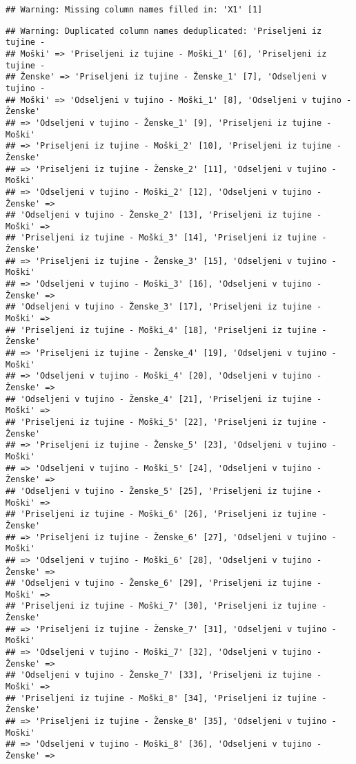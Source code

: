 \documentclass[]{article}
\begin{document}
\begin{verbatim}
## Warning: Missing column names filled in: 'X1' [1]
\end{verbatim}

\begin{verbatim}
## Warning: Duplicated column names deduplicated: 'Priseljeni iz tujine -
## Moški' => 'Priseljeni iz tujine - Moški_1' [6], 'Priseljeni iz tujine -
## Ženske' => 'Priseljeni iz tujine - Ženske_1' [7], 'Odseljeni v tujino -
## Moški' => 'Odseljeni v tujino - Moški_1' [8], 'Odseljeni v tujino - Ženske'
## => 'Odseljeni v tujino - Ženske_1' [9], 'Priseljeni iz tujine - Moški'
## => 'Priseljeni iz tujine - Moški_2' [10], 'Priseljeni iz tujine - Ženske'
## => 'Priseljeni iz tujine - Ženske_2' [11], 'Odseljeni v tujino - Moški'
## => 'Odseljeni v tujino - Moški_2' [12], 'Odseljeni v tujino - Ženske' =>
## 'Odseljeni v tujino - Ženske_2' [13], 'Priseljeni iz tujine - Moški' =>
## 'Priseljeni iz tujine - Moški_3' [14], 'Priseljeni iz tujine - Ženske'
## => 'Priseljeni iz tujine - Ženske_3' [15], 'Odseljeni v tujino - Moški'
## => 'Odseljeni v tujino - Moški_3' [16], 'Odseljeni v tujino - Ženske' =>
## 'Odseljeni v tujino - Ženske_3' [17], 'Priseljeni iz tujine - Moški' =>
## 'Priseljeni iz tujine - Moški_4' [18], 'Priseljeni iz tujine - Ženske'
## => 'Priseljeni iz tujine - Ženske_4' [19], 'Odseljeni v tujino - Moški'
## => 'Odseljeni v tujino - Moški_4' [20], 'Odseljeni v tujino - Ženske' =>
## 'Odseljeni v tujino - Ženske_4' [21], 'Priseljeni iz tujine - Moški' =>
## 'Priseljeni iz tujine - Moški_5' [22], 'Priseljeni iz tujine - Ženske'
## => 'Priseljeni iz tujine - Ženske_5' [23], 'Odseljeni v tujino - Moški'
## => 'Odseljeni v tujino - Moški_5' [24], 'Odseljeni v tujino - Ženske' =>
## 'Odseljeni v tujino - Ženske_5' [25], 'Priseljeni iz tujine - Moški' =>
## 'Priseljeni iz tujine - Moški_6' [26], 'Priseljeni iz tujine - Ženske'
## => 'Priseljeni iz tujine - Ženske_6' [27], 'Odseljeni v tujino - Moški'
## => 'Odseljeni v tujino - Moški_6' [28], 'Odseljeni v tujino - Ženske' =>
## 'Odseljeni v tujino - Ženske_6' [29], 'Priseljeni iz tujine - Moški' =>
## 'Priseljeni iz tujine - Moški_7' [30], 'Priseljeni iz tujine - Ženske'
## => 'Priseljeni iz tujine - Ženske_7' [31], 'Odseljeni v tujino - Moški'
## => 'Odseljeni v tujino - Moški_7' [32], 'Odseljeni v tujino - Ženske' =>
## 'Odseljeni v tujino - Ženske_7' [33], 'Priseljeni iz tujine - Moški' =>
## 'Priseljeni iz tujine - Moški_8' [34], 'Priseljeni iz tujine - Ženske'
## => 'Priseljeni iz tujine - Ženske_8' [35], 'Odseljeni v tujino - Moški'
## => 'Odseljeni v tujino - Moški_8' [36], 'Odseljeni v tujino - Ženske' =>

\end{verbatim}
\end{document}
